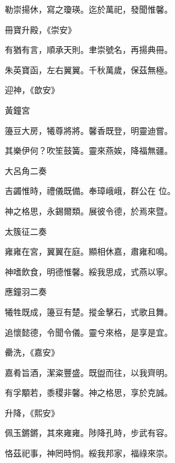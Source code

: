 \begin{pinyinscope}
 勒崇揚休，寫之瓊瑛。迄於萬祀，發聞惟馨。



 冊寶升殿，《崇安》



 有猶有言，順承天則。聿崇號名，再揚典冊。



 朱英寶函，左右翼翼。千秋萬歲，保茲無極。



 迎神，《歆安》



 黃鐘宮



 籩豆大房，犧尊將將。馨香既登，明靈迪嘗。



 其樂伊何？吹笙鼓簧。靈來燕娭，降福無疆。



 大呂角二奏



 吉蠲惟時，禮儀既備。奉璋峨峨，群公在
 位。



 神之格思，永錫爾類。展彼令德，於焉來暨。



 太簇征二奏



 雍雍在宮，翼翼在庭。顯相休嘉，肅雍和鳴。



 神嗜飲食，明德惟馨。綏我思成，式燕以寧。



 應鐘羽二奏



 犧牲既成，籩豆有楚。摐金擊石，式歌且舞。



 追懷懿德，令聞令儀。靈兮來格，是享是宜。



 罍洗，《嘉安》



 嘉肴旨酒，潔粢豐盛。既盥而往，以我齊明。



 有孚顒若，黍稷非馨。神之格思，享於克誠。



 升降，《熙安》



 佩玉鏘鏘，其來雍雍。陟降孔時，步武有容。



 恪茲祀事，神罔時恫。綏我邦家，福祿來崇。




\end{pinyinscope}
